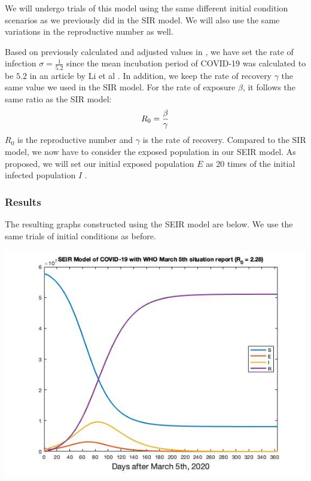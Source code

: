 \documentclass[12pt, a4paper]{article}
\begin{document}
        We will undergo trials of this model using the same different initial condition scenarios as we previously did in the SIR model. We will also use the same variations in the reproductive number as well.
        
        Based on previously calculated and adjusted values in \cite{parameter}, we have set the rate of infection $\sigma=\frac{1}{5.2}$ since the mean incubation period of COVID-19 was calculated to be $5.2$ in an article by Li et al \cite{sigma}. In addition, we keep the rate of recovery $\gamma$ the same value we used in the SIR model. For the rate of exposure $\beta$, it follows the same ratio as the SIR model: 
        \[
            R_0 = \frac{\beta}{\gamma} \\
        \]
        $R_0$ is the reproductive number and $\gamma$ is the rate of recovery. Compared to the SIR model, we now have to consider the exposed population in our SEIR model. As proposed, we will set our initial exposed population $E$ as 20 times of the initial infected population $I$ \cite{parameter}. 
        
        \subsubsection{Results}
        
        The resulting graphs constructed using the SEIR model are below. We use the same trials of initial conditions as before.
        
        \includegraphics[scale=0.75]{plots/whoseir228.jpg}
        
\end{document}
